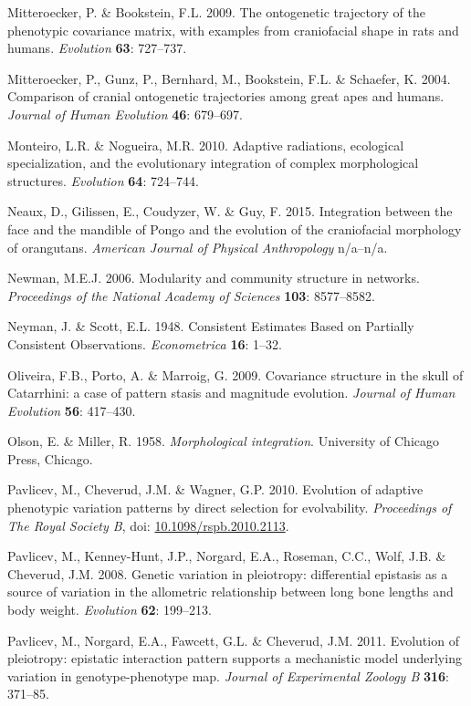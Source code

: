 \documentclass[11pt,twoside]{report}
\begin{document}
Mitteroecker, P. \& Bookstein, F.L. 2009. The ontogenetic trajectory of
the phenotypic covariance matrix, with examples from craniofacial shape
in rats and humans. \emph{Evolution} \textbf{63}: 727--737.

Mitteroecker, P., Gunz, P., Bernhard, M., Bookstein, F.L. \& Schaefer,
K. 2004. Comparison of cranial ontogenetic trajectories among great apes
and humans. \emph{Journal of Human Evolution} \textbf{46}: 679--697.

Monteiro, L.R. \& Nogueira, M.R. 2010. Adaptive radiations, ecological
specialization, and the evolutionary integration of complex
morphological structures. \emph{Evolution} \textbf{64}: 724--744.

Neaux, D., Gilissen, E., Coudyzer, W. \& Guy, F. 2015. Integration
between the face and the mandible of Pongo and the evolution of the
craniofacial morphology of orangutans. \emph{American Journal of
Physical Anthropology} n/a--n/a.

Newman, M.E.J. 2006. Modularity and community structure in networks.
\emph{Proceedings of the National Academy of Sciences} \textbf{103}:
8577--8582.

Neyman, J. \& Scott, E.L. 1948. Consistent Estimates Based on Partially
Consistent Observations. \emph{Econometrica} \textbf{16}: 1--32.

Oliveira, F.B., Porto, A. \& Marroig, G. 2009. Covariance structure in
the skull of Catarrhini: a case of pattern stasis and magnitude
evolution. \emph{Journal of Human Evolution} \textbf{56}: 417--430.

Olson, E. \& Miller, R. 1958. \emph{Morphological integration}.
University of Chicago Press, Chicago.

Pavlicev, M., Cheverud, J.M. \& Wagner, G.P. 2010. Evolution of adaptive
phenotypic variation patterns by direct selection for evolvability.
\emph{Proceedings of The Royal Society B}, doi:
\href{http://dx.doi.org/10.1098/rspb.2010.2113}{10.1098/rspb.2010.2113}.

Pavlicev, M., Kenney-Hunt, J.P., Norgard, E.A., Roseman, C.C., Wolf,
J.B. \& Cheverud, J.M. 2008. Genetic variation in pleiotropy:
differential epistasis as a source of variation in the allometric
relationship between long bone lengths and body weight. \emph{Evolution}
\textbf{62}: 199--213.

Pavlicev, M., Norgard, E.A., Fawcett, G.L. \& Cheverud, J.M. 2011.
Evolution of pleiotropy: epistatic interaction pattern supports a
mechanistic model underlying variation in genotype-phenotype map.
\emph{Journal of Experimental Zoology B} \textbf{316}: 371--85.
\end{document}
